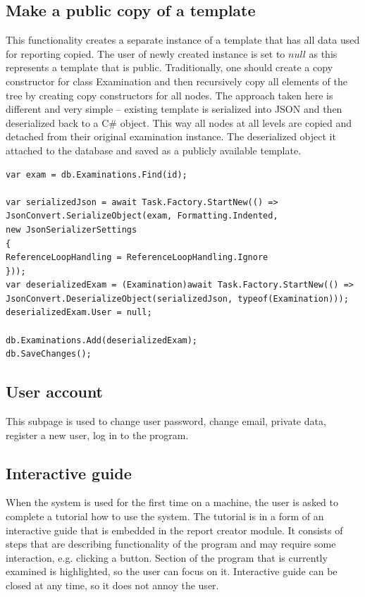 \documentclass[12pt, twoside, openany]{report}
\theoremstyle{definition}
\begin{document}
\subsection{Make a public copy of a template}
This functionality creates a separate instance of a template that has all data used for reporting copied. The user of newly created instance is set to $null$ as this represents a template that is public. Traditionally, one should create a copy constructor for class Examination and then recursively copy all elements of the tree by creating copy constructors for all nodes. The approach taken here is different and very simple – existing template is serialized into JSON and then deserialized back to a C\# object. This way all nodes at all levels are copied and detached from their original examination instance. The deserialized object it attached to the database and saved as a publicly available template.
\begin{lstlisting}[style=sharpc, caption=Code used to make a public copy of a template \label{make-copy-template}]
var exam = db.Examinations.Find(id);

var serializedJson = await Task.Factory.StartNew(() => JsonConvert.SerializeObject(exam, Formatting.Indented,
new JsonSerializerSettings
{
ReferenceLoopHandling = ReferenceLoopHandling.Ignore
}));
var deserializedExam = (Examination)await Task.Factory.StartNew(() => JsonConvert.DeserializeObject(serializedJson, typeof(Examination)));
deserializedExam.User = null;

db.Examinations.Add(deserializedExam);
db.SaveChanges();
\end{lstlisting}
\subsection{User account}
This subpage is used to change user password, change email, private data, register a new user, log in to the program. 
\subsection{Interactive guide}
When the system is used for the first time on a machine, the user is asked to complete a tutorial how to use the system. The tutorial is in a form of an interactive guide that is embedded in the report creator module. It consists of steps that are describing functionality of the program and may require some interaction, e.g. clicking a button. Section of the program that is currently examined is highlighted, so the user can focus on it. Interactive guide can be closed at any time, so it does not annoy the user.
\end{document}
